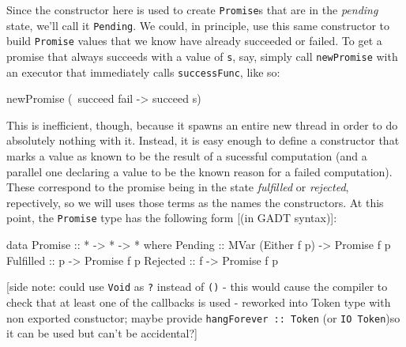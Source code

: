 \documentclass[12pt, english, letterpaper]{kuthesis}
\newcommand{\lit}[1]{\texttt{#1}}
\begin{document}
Since the constructor here is used to create \lit{Promise}s that are in the \emph{pending} state, we'll call it \lit{Pending}.  We could, in principle, use this same constructor to build \lit{Promise} values that we know have already succeeded or failed.  To get a promise that always succeeds with a value of \lit s, say, simply call \lit{newPromise} with an executor that immediately calls \lit{successFunc}, like so:
\begin{code}
newPromise (\ succeed fail -> succeed s)
\end{code}
This is inefficient, though, because it spawns an entire new thread in order to do absolutely nothing with it.  Instead, it is easy enough to define a constructor that marks a value as known to be the result of a sucessful computation (and a parallel one declaring a value to be the known reason for a failed computation).  These correspond to the promise being in the state \emph{fulfilled} or \emph{rejected}, repectively, so we will uses those terms as the names the constructors.  At this point, the \lit{Promise} type has the following form [(in GADT syntax)]:
\begin{code}
data Promise :: * -> * -> * where
  Pending :: MVar (Either f p) -> Promise f p
  Fulfilled :: p -> Promise f p
  Rejected :: f -> Promise f p
\end{code}
[side note: could use \lit{Void} as \lit ? instead of \lit{()} - this would cause the compiler to check that at least one of the callbacks is used - reworked into Token type with non exported constuctor; maybe provide \lit{hangForever :: Token} (or \lit{IO Token})so it can be used but can't be accidental?]
\end{document}
